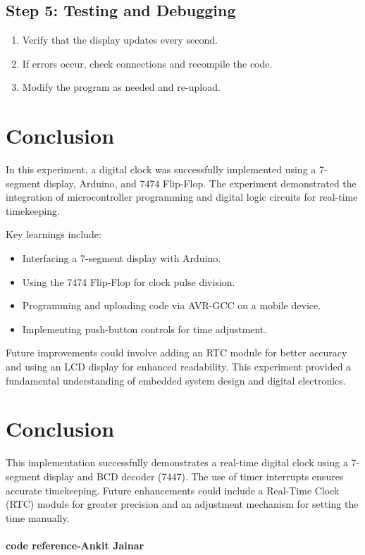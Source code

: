 \documentclass[a4paper,12pt]{article}
\begin{document}
\subsection{Step 5: Testing and Debugging}
\begin{enumerate}
    \item Verify that the display updates every second.
    \item If errors occur, check connections and recompile the code.
    \item Modify the program as needed and re-upload.
\end{enumerate}

\section{Conclusion}

In this experiment, a digital clock was successfully implemented using a {7-segment display}, {Arduino}, and {7474 Flip-Flop}. The experiment demonstrated the integration of {microcontroller programming} and {digital logic circuits} for real-time timekeeping.

Key learnings include:
\begin{itemize}
    \item Interfacing a 7-segment display with Arduino.
    \item Using the 7474 Flip-Flop for clock pulse division.
    \item Programming and uploading code via AVR-GCC on a mobile device.
    \item Implementing push-button controls for time adjustment.
\end{itemize}

Future improvements could involve adding an {RTC module} for better accuracy and using an {LCD display} for enhanced readability. This experiment provided a fundamental understanding of embedded system design and digital electronics.




\section{Conclusion}

This implementation successfully demonstrates a {real-time digital clock} using a {7-segment display} and {BCD decoder (7447)}. The use of {timer interrupts} ensures accurate timekeeping. Future enhancements could include a {Real-Time Clock (RTC) module} for greater precision and an {adjustment mechanism} for setting the time manually.\\ \\

\textbf{code reference-{Ankit Jainar}}
\end{document}
